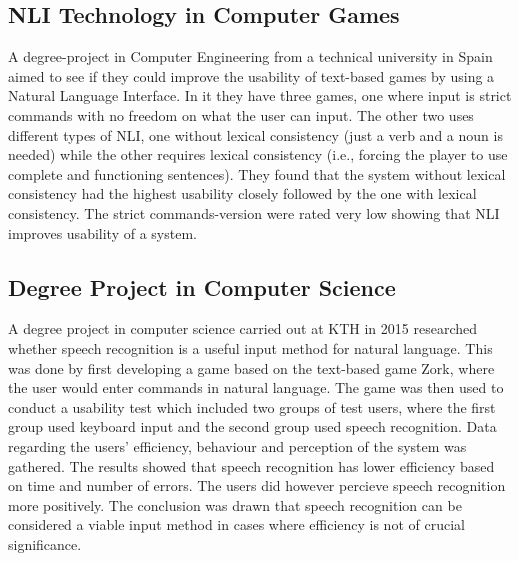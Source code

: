 \subsection{NLI Technology in Computer Games}
A degree-project in Computer Engineering from a technical university in Spain aimed to see if they could improve the usability of text-based games by using a Natural Language Interface. In it they have three games, one where input is strict commands with no freedom on what the user can input. The other two uses different types of NLI, one without lexical consistency (just a verb and a noun is needed) while the other requires lexical consistency (i.e., forcing the player to use complete and functioning sentences). They found that the system without lexical consistency had the highest usability closely followed by the one with lexical consistency. The strict commands-version were rated very low showing that NLI improves usability of a system. \citep{Memo}

\subsection{Degree Project in Computer Science} %
A degree project in computer science carried out at KTH in 2015 researched whether speech recognition is a useful input method for natural language. This was done by first developing a game based on the text-based game Zork, where the user would enter commands in natural language. The game was then used to conduct a usability test which included two groups of test users, where the first group used keyboard input and the second group used speech recognition. Data regarding the users' efficiency, behaviour and perception of the system was gathered. The results showed that speech recognition has lower efficiency based on time and number of errors. The users did however percieve speech recognition more positively. The conclusion was drawn that speech recognition can be considered a viable input method in cases where efficiency is not of crucial significance. \citep{qvar}